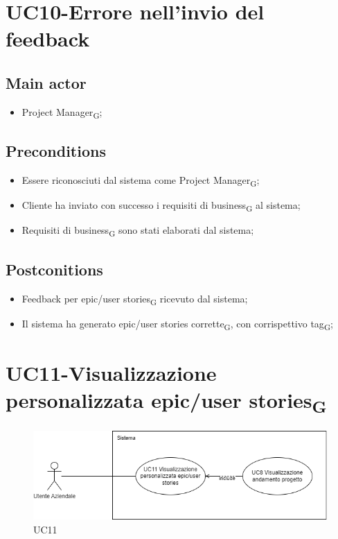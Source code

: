 \documentclass{article}
\begin{document}
\section{UC10-Errore nell'invio del feedback}

     \subsection*{Main actor}
     \begin{itemize}
         \item Project Manager\textsubscript{G};
     \end{itemize}
   \subsection*{Preconditions}
        \begin{itemize}
            \item Essere riconosciuti dal sistema come Project Manager\textsubscript{G};
            \item Cliente ha inviato con successo i requisiti di business\textsubscript{G} al sistema;
            \item Requisiti di business\textsubscript{G} sono stati elaborati dal sistema;
        \end{itemize}
        
    \subsection*{Postconitions}
        \begin{itemize}
            \item Feedback per epic/user stories\textsubscript{G} ricevuto dal sistema;
            \item Il sistema ha generato epic/user stories corrette\textsubscript{G}, con corrispettivo tag\textsubscript{G};
        \end{itemize} 

  
\section{UC11-Visualizzazione personalizzata epic/user stories\textsubscript{G}}
    \begin{figure}[h]
      \centering
      \includegraphics[width=.8\textwidth, height=.6\textheight, keepaspectratio]{./imgUML/UC11.png}
        \caption{UC11}
      \label{fig:UC11}
    \end{figure}
    
\end{document}

